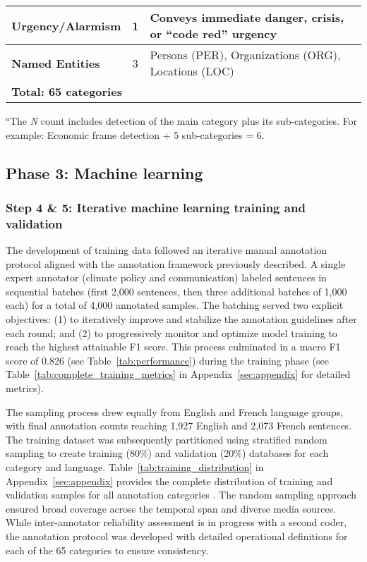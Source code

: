 \documentclass[12pt]{article}
\begin{document}
\begin{table}[!ht]
\begin{tabularx}{\textwidth}{lcX}
\midrule
\cellcolor{gray!10}\textbf{Urgency/Alarmism} & \cellcolor{gray!10}1 & \cellcolor{gray!10}Conveys immediate danger, crisis, or ``code red'' urgency \\
\midrule
\cellcolor{gray!10}\textbf{Named Entities} & \cellcolor{gray!10}3 & \cellcolor{gray!10}Persons (PER), Organizations (ORG), Locations (LOC) \\
\midrule
\multicolumn{3}{l}{\cellcolor{gray!25}\textbf{Total: 65 categories}} \\
\bottomrule
\end{tabularx}
\vspace{-0.1em}
{\footnotesize $^a$The \emph{N} count includes detection of the main category plus its sub-categories. For example: Economic frame detection + 5 sub-categories = 6.}
\end{table}

\subsection{Phase 3: Machine learning}
\subsubsection{Step 4 \& 5: Iterative machine learning training and validation}

The development of training data followed an iterative manual annotation protocol aligned with the annotation framework previously described. A single expert annotator (climate policy and communication) labeled sentences in sequential batches (first 2,000 sentences, then three additional batches of 1,000 each) for a total of 4,000 annotated samples. The batching served two explicit objectives: (1) to iteratively improve and stabilize the annotation guidelines after each round; and (2) to progressively monitor and optimize model training to reach the highest attainable F1 score. This process culminated in a macro F1 score of 0.826 (see Table~\ref{tab:performance}) during the training phase (see Table~\ref{tab:complete_training_metrics} in Appendix~\ref{sec:appendix} for detailed metrics).

The sampling process drew equally from English and French language groups, with final annotation counts reaching 1,927 English and 2,073 French sentences. The training dataset was subsequently partitioned using stratified random sampling to create training (80\%) and validation (20\%) databases for each category and language. Table~\ref{tab:training_distribution} in Appendix~\ref{sec:appendix} provides the complete distribution of training and validation samples for all annotation categories \autocite{doAugmentedSocialScientist2022}. The random sampling approach ensured broad coverage across the temporal span and diverse media sources. While inter-annotator reliability assessment is in progress with a second coder, the annotation protocol was developed with detailed operational definitions for each of the 65 categories to ensure consistency.
\end{document}

